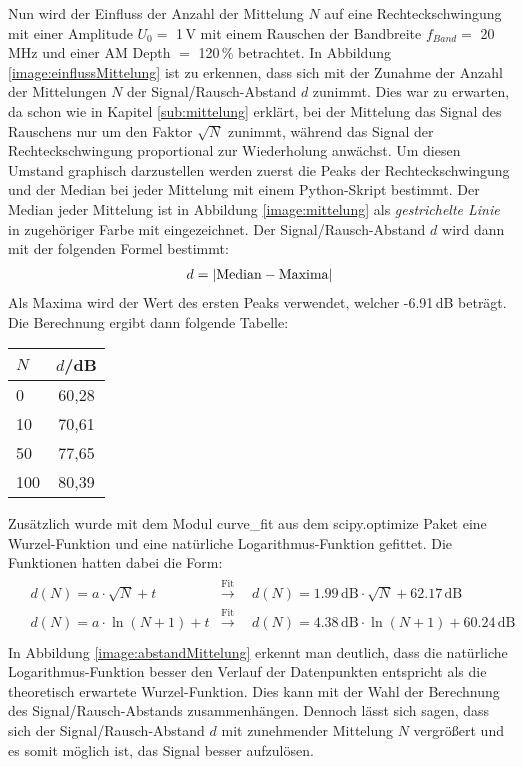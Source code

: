 Nun wird der Einfluss der Anzahl der Mittelung $N$ auf eine Rechteckschwingung mit einer Amplitude $U_0=$ 1\,V mit einem Rauschen der Bandbreite $f_{Band}=$ 20\,MHz und einer AM Depth $=$ 120\,\% betrachtet.
In Abbildung \ref{image:einflussMittelung} ist zu erkennen, dass sich mit der Zunahme der Anzahl der Mittelungen $N$ der Signal/Rausch-Abstand $d$ zunimmt. Dies war zu erwarten, da schon wie in Kapitel \ref{sub:mittelung} erklärt, bei der Mittelung das Signal des Rauschens nur um den Faktor $\sqrt{N}$ zunimmt, während das Signal der Rechteckschwingung proportional zur Wiederholung anwächst. Um diesen Umstand graphisch darzustellen werden zuerst die Peaks der Rechteckschwingung und der Median bei jeder Mittelung mit einem Python-Skript bestimmt. Der Median jeder Mittelung ist in Abbildung \ref{image:mittelung} als \textit{gestrichelte Linie} in zugehöriger Farbe mit eingezeichnet. Der Signal/Rausch-Abstand $d$ wird dann mit der folgenden Formel bestimmt:
\begin{gather}
    d = \abs{\text{Median} - \text{Maxima}}
\end{gather}
Als Maxima wird der Wert des ersten Peaks verwendet, welcher -6.91\,dB beträgt. Die Berechnung ergibt dann folgende Tabelle:
\begin{center}
    \begin{tabular}{l | c}
        $N$ & $d$/dB\\
        \hline
        0   & 60,28 \\
        10  & 70,61 \\
        50  & 77,65 \\
        100 & 80,39 \\
    \end{tabular}
\end{center}
Zusätzlich wurde mit dem Modul curve\_fit aus dem scipy.optimize Paket eine Wurzel-Funktion und eine natürliche Logarithmus-Funktion gefittet. Die Funktionen hatten dabei die Form:
\begin{gather}
    \begin{aligned}
       &d(N) = a\cdot\sqrt{N} + t &\xrightarrow{\text{Fit}} &~~d(N) = 1.99\,\text{dB}\cdot\sqrt{N} + 62.17\,\text{dB} \\
       &d(N) = a\cdot\ln(N+1) + t &\xrightarrow{\text{Fit}} &~~d(N) = 4.38\,\text{dB}\cdot\ln(N+1) + 60.24\,\text{dB} \\
    \end{aligned}
\end{gather}
In Abbildung \ref{image:abstandMittelung} erkennt man deutlich, dass die natürliche Logarithmus-Funktion besser den Verlauf der Datenpunkten entspricht als die theoretisch erwartete Wurzel-Funktion. Dies kann mit der Wahl der Berechnung des Signal/Rausch-Abstands zusammenhängen. Dennoch lässt sich sagen, dass sich der Signal/Rausch-Abstand $d$ mit zunehmender Mittelung $N$ vergrößert und es somit möglich ist, das Signal besser aufzulösen.
